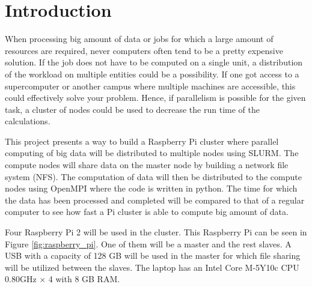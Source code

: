 \documentclass[../Head/Report.tex]{subfiles}
\begin{document}
\section{Introduction}
When processing big amount of data or jobs for which a large amount of resources are required, never computers often tend to be a pretty expensive solution. If the job does not have to be computed on a single unit, a distribution of the workload on multiple entities could be a possibility. If one got access to a supercomputer or another campus where multiple machines are accessible, this could effectively solve your problem. Hence, if parallelism is possible for the given task, a cluster of nodes could be used to decrease the run time of the calculations.  

This project presents a way to build a Raspberry Pi cluster where parallel computing of big data will be distributed to multiple nodes using SLURM. The compute nodes will share data on the master node by building a network file system (NFS). The computation of data will then be distributed to the compute nodes using OpenMPI where the code is written in python. The time for which the data has been processed and completed will be compared to that of a regular computer to see how fast a Pi cluster is able to compute big amount of data.

Four Raspberry Pi 2 will be used in the cluster. This Raspberry Pi can be seen in Figure \ref{fig:raspberry_pi}. One of them will be a master and the rest slaves. A USB with a capacity of 128 GB will be used in the master for which file sharing will be utilized between the slaves. The laptop has an Intel Core M-5Y10c CPU 0.80GHz $\times $ 4 with 8 GB RAM.
\end{document}

